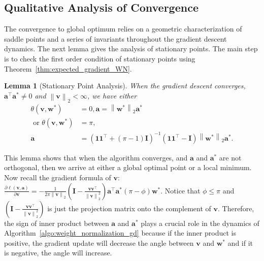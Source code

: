 \documentclass{article}
\newcommand{\firstlayer}{w}
\newcommand{\firstlayerWN}{v}
\newcommand{\secondlayer}{a}
\newcommand{\mat}[1]{\mathbf{#1}}
\newcommand{\vect}[1]{\mathbf{#1}}
\newcommand{\norm}[1]{\left\|#1\right\|}
\newtheorem{lem}{Lemma}[section]
\begin{document}
\subsection{Qualitative Analysis of Convergence}\label{sec:proof_sketch_qualitative}
The convergence to global optimum relies on a geometric characterization of saddle points and a series of invariants throughout the gradient descent dynamics.
The next lemma gives the analysis of stationary points.
The main step is to check the first order condition of stationary points using Theorem~\ref{thm:expected_gradient_WN}.
\begin{lem}[Stationary Point Analysis]\label{lem:stationary_point}
When the gradient descent converges, $\vect{\secondlayer}^\top \vect{\secondlayer}^* \neq 0$ and $\norm{\vect{\firstlayerWN}}_2 < \infty$, we have either \begin{align*}
\theta\left(\vect{\firstlayerWN},\vect{\firstlayer}^*\right) &= 0, \vect{\secondlayer} = \norm{\vect{\firstlayer}^*}_2\vect{\secondlayer}^* \\
\text{ or }
\theta\left(\vect{\firstlayerWN},\vect{\firstlayer}^*\right) &= \pi, \\\vect{\secondlayer} &= \left(\vect{1}\vect{1}^\top + \left(\pi-1\right)\mat{I}\right)^{-1}\left(\vect{1}\vect{1}^\top - \mat{I}\right)\norm{\vect{\firstlayer}^*}_2\vect{\secondlayer}^*.
\end{align*}
\end{lem}
This lemma shows that when the algorithm converges, and $\vect{\secondlayer}$ and $\vect{\secondlayer}^*$ are not orthogonal, then we arrive at either a global optimal point or a local minimum.
Now recall the gradient formula of $\vect{\firstlayerWN}$:
$\frac{\partial \ell\left(\vect{\firstlayerWN},\vect{\secondlayer}\right)}{\partial \vect{\firstlayerWN}}= 
-\frac{1}{2\pi\norm{\vect{\firstlayerWN}}_2}\left(\mat{I}-\frac{\vect{\firstlayerWN}\vect{\firstlayerWN}^\top}{\norm{\vect{\firstlayerWN}}_2^2}\right)\vect{\secondlayer}^\top \vect{\secondlayer}^*\left(\pi-\phi\right)\vect{w}^*$.
Notice that $\phi \le \pi$ and $\left(\mat{I}-\frac{\vect{\firstlayerWN}\vect{\firstlayerWN}^\top}{\norm{\vect{\firstlayerWN}}_2^2}\right)$ is just the projection matrix onto the complement of $\vect{\firstlayerWN}$.
Therefore, the sign of inner product between $\vect{\secondlayer}$ and $\vect{\secondlayer}^*$ plays a crucial role in the dynamics of Algorithm~\ref{algo:weight_normalization_gd} because if the inner product is positive, the gradient update will decrease the angle between $\vect{\firstlayerWN}$ and $\vect{\firstlayer}^*$ and if it is negative, the angle will increase.
\end{document}
